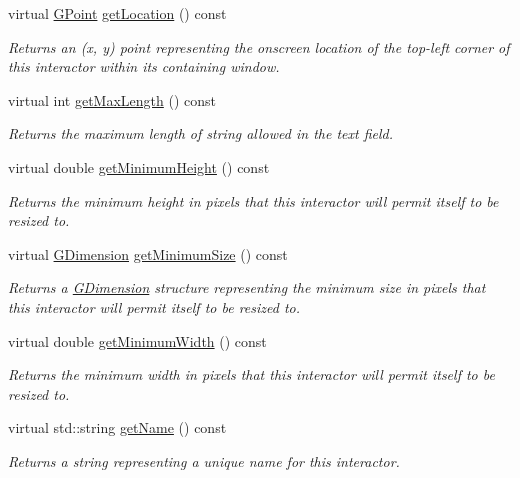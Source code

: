 \begin{DoxyCompactItemize}
virtual \mbox{\hyperlink{structGPoint}{G\+Point}} \mbox{\hyperlink{classGInteractor_a4f83802015511edeb63b892830812c11}{get\+Location}} () const
\begin{DoxyCompactList}\small\item\em Returns an (x, y) point representing the onscreen location of the top-\/left corner of this interactor within its containing window. \end{DoxyCompactList}\item 
virtual int \mbox{\hyperlink{classGTextField_a465e41b66da9e75443bf0b7951582468}{get\+Max\+Length}} () const
\begin{DoxyCompactList}\small\item\em Returns the maximum length of string allowed in the text field. \end{DoxyCompactList}\item 
virtual double \mbox{\hyperlink{classGInteractor_aed4b0075fcc434499c3cb3e46896bda3}{get\+Minimum\+Height}} () const
\begin{DoxyCompactList}\small\item\em Returns the minimum height in pixels that this interactor will permit itself to be resized to. \end{DoxyCompactList}\item 
virtual \mbox{\hyperlink{structGDimension}{G\+Dimension}} \mbox{\hyperlink{classGInteractor_a66b5af0b32493b4d597ca0a3df2049ea}{get\+Minimum\+Size}} () const
\begin{DoxyCompactList}\small\item\em Returns a \mbox{\hyperlink{structGDimension}{G\+Dimension}} structure representing the minimum size in pixels that this interactor will permit itself to be resized to. \end{DoxyCompactList}\item 
virtual double \mbox{\hyperlink{classGInteractor_a59e668114fe3d49d2a0f28deb258f7c8}{get\+Minimum\+Width}} () const
\begin{DoxyCompactList}\small\item\em Returns the minimum width in pixels that this interactor will permit itself to be resized to. \end{DoxyCompactList}\item 
virtual std\+::string \mbox{\hyperlink{classGInteractor_a8a60438a5b55d0b2ceb35c8674b9d8c5}{get\+Name}} () const
\begin{DoxyCompactList}\small\item\em Returns a string representing a unique name for this interactor. \end{DoxyCompactList}\item 

\end{DoxyCompactItemize}
